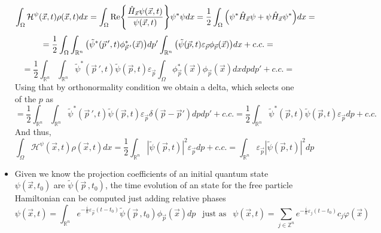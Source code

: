 \documentclass[11pt, a4paper]{article} %
\newcommand{\R}{\mathbb{R}} %
\newcommand{\Z}{\mathbb{Z}} %
\newcommand{\h}{\mathcal{H}}
\begin{document}
\begin{itemize}
{\begin{equation}
\int_\Omega \h^\psi(\vec{x},t)\rho(\vec{x},t) dx =\int_\Omega \Re{\frac{\hat{H}_{\vec{x}}\psi(\vec{x},t)}{\psi(\vec{x},t)}} \psi^*\psi dx =\frac{1}{2}\int_\Omega \qty(\psi^*\hat{H}_{\vec{x}}\psi+\psi\hat{H}_{\vec{x}}\psi^*)dx=
\end{equation}
$$
= \frac{1}{2}\int_\Omega\int_{\R^n}\qty(\tilde{\psi}^*(\vec{p}\,',t)\phi^*_{\vec{p}\,'}(\vec{x}))dp'\int
_{\R^n}\qty(\tilde{\psi}(\vec{p},t)\varepsilon_{\vec{p}} \phi_{\vec{p}}(\vec{x})) dx+c.c.=
$$
$$
=\frac{1}{2}\int_{\R^n}\int_{\R^n}\tilde{\psi}^*(\vec{p}\,',t)\tilde{\psi}(\vec{p},t)\varepsilon_{\vec{p}}\int_{\Omega}\phi^*_{\vec{p}}(\vec{x})\phi_{\vec{p}}(\vec{x})dx dp dp' +c.c.=
$$
Using that by orthonormality condition we obtain a delta, which selects one of the $p$ as
\begin{equation}
=\frac{1}{2}\int_{\R^n}\int_{\R^n}\tilde{\psi}^*(\vec{p}\,',t)\tilde{\psi}(\vec{p},t)\varepsilon_{\vec{p}}\delta(\vec{p}-\vec{p}') dp dp' +c.c.=\frac{1}{2}\int_{\R^n}\tilde{\psi}^*(\vec{p},t)\tilde{\psi}(\vec{p},t)\varepsilon_{\vec{p}}dp  +c.c.
\end{equation}
And thus,
$$
\int_\Omega \h^\psi(\vec{x},t)\rho(\vec{x},t) dx =\frac{1}{2}\int_{\R^n}|\tilde{\psi}(\vec{p},t)|^2\varepsilon_{\vec{p}}dp  +c.c.=\int_{\R^n}\varepsilon_{\vec{p}}|\tilde{\psi}(\vec{p},t)|^2dp
$$
}
\item Given we know the projection coefficients of an initial quantum state $\psi(\vec{x},t_0)$ are $\tilde{\psi}(\vec{p}\,,t_0)$, the time evolution of an state for the free particle Hamiltonian can be computed just adding relative phases 
\begin{equation}
\psi(\vec{x},t)=\int_{\R^n} e^{-\frac{i}{\hbar}\varepsilon_{\vec{p}}(t-t_0)}\tilde{\psi}(\vec{p}\,,t_0)\phi_{\vec{p}}(\vec{x}) dp \ \ \text{ just as }\ \ \psi(\vec{x},t)=\sum_{j\in\Z^n}e^{-\frac{i}{\hbar}\varepsilon_j(t-t_0)} c_j\varphi(\vec{x})
\end{equation}


\end{itemize}
\end{document}
